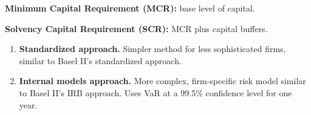 

\begin{lettered}
\item \textbf{Minimum Capital Requirement (MCR):} base level of capital.
\item \textbf{Solvency Capital Requirement (SCR):} MCR plus capital buffers.
\end{lettered}


\begin{enumerate}
\item[\textcolor{rust}{\sffamily\bfseries 1)}] \textbf{Standardized approach.}
Simpler method for less sophisticated firms, similar to Basel II's standardized
approach.
\item[\textcolor{rust}{\sffamily\bfseries 2)}] \textbf{Internal models approach.}
More complex, firm-specific risk model similar to Basel II's IRB approach. Uses VaR
at a 99.5\% confidence level for one year.
\end{enumerate}
